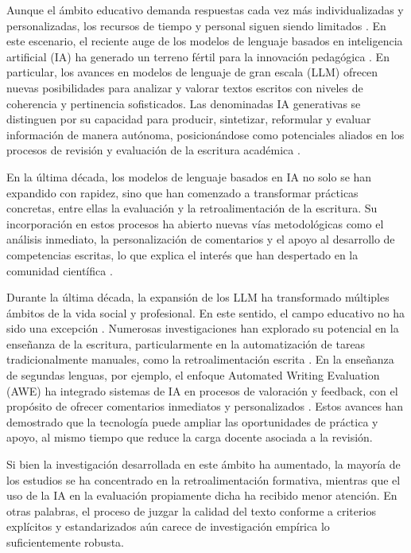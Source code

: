 \documentclass[spanish]{textolivre}
\begin{document}
Aunque el ámbito educativo demanda respuestas cada vez más individualizadas y personalizadas, los recursos de tiempo y personal siguen siendo limitados \cite{sologuren2023}. En este escenario, el reciente auge de los modelos de lenguaje basados en inteligencia artificial (IA) ha generado un terreno fértil para la innovación pedagógica \cite{unesco2024}. En particular, los avances en modelos de lenguaje de gran escala (LLM) ofrecen nuevas posibilidades para analizar y valorar textos escritos con niveles de coherencia y pertinencia sofisticados. Las denominadas IA generativas se distinguen por su capacidad para producir, sintetizar, reformular y evaluar información de manera autónoma, posicionándose como potenciales aliados en los procesos de revisión y evaluación de la escritura académica \cite{poole2024}.

En la última década, los modelos de lenguaje basados en IA no solo se han expandido con rapidez, sino que han comenzado a transformar prácticas concretas, entre ellas la evaluación y la retroalimentación de la escritura. Su incorporación en estos procesos ha abierto nuevas vías metodológicas como el análisis inmediato, la personalización de comentarios y el apoyo al desarrollo de competencias escritas, lo que explica el interés que han despertado en la comunidad científica \cite{ossa2023, poole2024, teng-ma2024, teng2025, garciafernandez2025}.

Durante la última década, la expansión de los LLM ha transformado múltiples ámbitos de la vida social y profesional. En este sentido, el campo educativo no ha sido una excepción \cite{mateogirona2025}. Numerosas investigaciones han explorado su potencial en la enseñanza de la escritura, particularmente en la automatización de tareas tradicionalmente manuales, como la retroalimentación escrita \cite{teng2025, poole2024, ossa2023, venegas2022}. En la enseñanza de segundas lenguas, por ejemplo, el enfoque Automated Writing Evaluation (AWE) ha integrado sistemas de IA en procesos de valoración y feedback, con el propósito de ofrecer comentarios inmediatos y personalizados \cite{teng2024, teng2025}. Estos avances han demostrado que la tecnología puede ampliar las oportunidades de práctica y apoyo, al mismo tiempo que reduce la carga docente asociada a la revisión.

Si bien la investigación desarrollada en este ámbito ha aumentado, la mayoría de los estudios se ha concentrado en la retroalimentación formativa, mientras que el uso de la IA en la evaluación propiamente dicha ha recibido menor atención. En otras palabras, el proceso de juzgar la calidad del texto conforme a criterios explícitos y estandarizados aún carece de investigación empírica lo suficientemente robusta.
\end{document}

